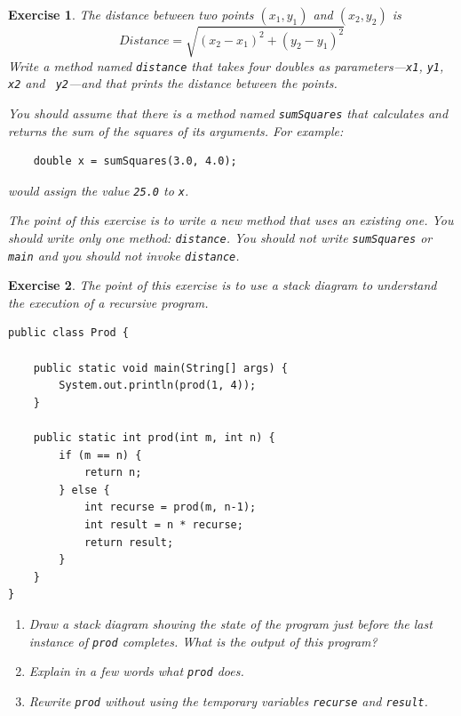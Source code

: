 \documentclass[12pt]{book}
\theoremstyle{exercise}
\newtheorem{exercise}{Exercise}[chapter]
\begin{document}
\begin{exercise}
The distance between two points $(x_1, y_1)$ and $(x_2, y_2)$ is
%
\[ Distance = \sqrt{(x_2 - x_1)^2 +(y_2 - y_1)^2} \]
%
Write a method named {\tt distance} that takes four
doubles as parameters---{\tt x1}, {\tt y1}, {\tt x2} and {\tt
y2}---and that prints the distance between the points.

You should assume that there is a method named {\tt sumSquares}
that calculates and returns the sum of the squares of its arguments.
For example:

\begin{lstlisting}
    double x = sumSquares(3.0, 4.0);
\end{lstlisting}
%
would assign the value {\tt 25.0} to {\tt x}.

The point of this exercise is to write a new method that uses an
existing one.  You should write only one method: {\tt distance}.  You
should not write {\tt sumSquares} or {\tt main} and you should not
invoke {\tt distance}.
\end{exercise}


\begin{exercise}
The point of this exercise is to use a stack diagram to understand
the execution of a recursive program.

\begin{lstlisting}
public class Prod {

    public static void main(String[] args) {
        System.out.println(prod(1, 4));
    }

    public static int prod(int m, int n) {
        if (m == n) {
            return n;
        } else {
            int recurse = prod(m, n-1);
            int result = n * recurse;
            return result;
        }
    }
}
\end{lstlisting}
%
\begin{enumerate}

\item Draw a stack diagram showing the state of the program just
before the last instance of {\tt prod} completes.
What is the output of this program?

\item Explain in a few words what {\tt prod} does.

\item Rewrite {\tt prod} without using the temporary variables
{\tt recurse} and {\tt result}.

\end{enumerate}
\end{exercise}
\end{document}
